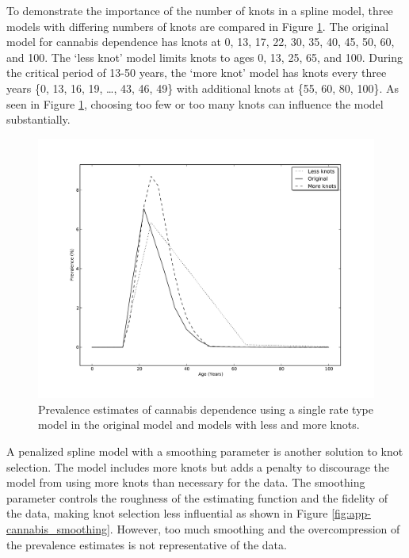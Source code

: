 To demonstrate the importance of the number of knots in a spline model, three models with differing numbers of knots are compared in Figure \ref{fig:app-cannabis_knots}.  The original model for cannabis dependence has knots at 0, 13, 17, 22, 30, 35, 40, 45, 50, 60, and 100.  The `less knot' model limits knots to ages 0, 13, 25, 65, and 100.   During the critical period of 13-50 years, the `more knot' model has knots every three years \{0, 13, 16, 19, \ldots, 43, 46, 49\} with additional knots at \{55, 60, 80, 100\}.  As seen in Figure \ref{fig:app-cannabis_knots}, choosing too few or too many knots can influence the model substantially.

    \begin{figure}[h]
        \begin{center}
            \includegraphics[width=\textwidth]{applications/cannabis_dependence-knots.pdf}
            \caption{Prevalence estimates of cannabis dependence using a single rate type model in the original model and models with less and more knots. }
        \label{fig:app-cannabis_knots}
        \end{center}
    \end{figure}

A penalized spline model with a smoothing parameter is another solution to knot selection.  The model includes more knots but adds a penalty to discourage the model from using more knots than necessary for the data.  The smoothing parameter controls the roughness of the estimating function and the fidelity of the data, making knot selection less influential as shown in Figure \ref{fig:app-cannabis_smoothing}.  However, too much smoothing and the overcompression of the prevalence estimates is not representative of the data.

